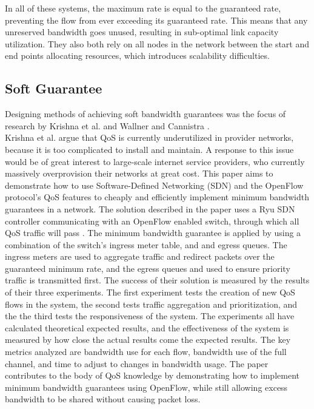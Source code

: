 \documentclass[accepted,single]{gipaper}
\begin{document}
In all of these systems, the maximum rate is equal to the guaranteed rate, preventing the flow from ever exceeding its guaranteed rate. This means that any unreserved bandwidth goes unused, resulting in sub-optimal link capacity utilization. They also both rely on all nodes in the network between the start and end points allocating resources, which introduces scalability difficulties.

\subsection{Soft Guarantee}
\label{soft_qos}

Designing methods of achieving soft bandwidth guarantees was the focus of research by Krishna et al. \cite{Krishna:2016} and Wallner and Cannistra \cite{Wallner:2013}.
\\


Krishna et al. \cite{Krishna:2016} argue that QoS is currently underutilized in provider networks, because it is too complicated to install and maintain. A response to this issue would be of great interest to large-scale internet service providers, who currently massively overprovision their networks at great cost. This paper aims to demonstrate how to use Software-Defined Networking (SDN) and the OpenFlow protocol’s QoS features to cheaply and efficiently implement minimum bandwidth guarantees in a network. The solution described in the paper uses a Ryu SDN controller communicating with an OpenFlow enabled switch, through which all QoS traffic will pass \cite{Krishna:2016}. The minimum bandwidth guarantee is applied by using a combination of the switch’s ingress meter table, and and egress queues. The ingress meters are used to aggregate traffic and redirect packets over the guaranteed minimum rate, and the egress queues and used to ensure priority traffic is transmitted first. The success of their solution is measured by the results of their three experiments. The first experiment tests the creation of new QoS flows in the system, the second tests traffic aggregation and prioritization, and the the third tests the responsiveness of the system. The experiments all have calculated theoretical expected results, and the effectiveness of the system is measured by how close the actual results come the expected results. The key metrics analyzed are bandwidth use for each flow, bandwidth use of the full channel, and time to adjust to changes in bandwidth usage. The paper contributes to the body of QoS knowledge by demonstrating how to implement minimum bandwidth guarantees using OpenFlow, while still allowing excess bandwidth to be shared without causing packet loss.
\end{document}
